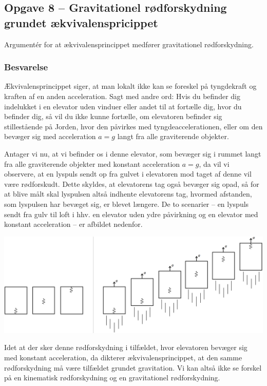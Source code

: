 \documentclass[../main.tex]{subfiles}
\begin{document}

\subsection{Opgave 8 -- Gravitationel rødforskydning grundet ækvivalenspricippet}
\setcounter{subsection}{8}
\setcounter{equation}{0}

Argumentér for at ækvivalensprincippet medfører gravitationel rødforskydning.


\subsubsection{Besvarelse}

Ækvivalensprincippet siger, at man lokalt ikke kan se foreskel på tyngdekraft og kraften af en anden acceleration. Sagt med andre ord: Hvis du befinder dig indelukket i en elevator uden vinduer eller andet til at fortælle dig, hvor du befinder dig, så vil du ikke kunne fortælle, om elevatoren befinder sig stillestående på Jorden, hvor den påvirkes med tyngdeaccelerationen, eller om den bevæger sig med acceleration $a = g$ langt fra alle graviterende objekter.

Antager vi nu, at vi befinder os i denne elevator, som bevæger sig i rummet langt fra alle graviterende objekter med konstant acceleration $a = g$, da vil vi observere, at en lyspuls sendt op fra gulvet i elevatoren mod taget af denne vil være rødforskudt. Dette skyldes, at elevatorens tag også bevæger sig opad, så for at blive målt skal lyspulsen altså indhente elevatorens tag, hvormed afstanden, som lyspulsen har bevæget sig, er blevet længere. De to scenarier -- en lyspuls sendt fra gulv til loft i hhv. en elevator uden ydre påvirkning og en elevator med konstant acceleration -- er afbildet nedenfor.
\begin{center}
    \includegraphics[width=\textwidth]{billeder/GravitationalRedshift.png}
\end{center}
Idet at der sker denne rødforskydning i tilfældet, hvor elevatoren bevæger sig med konstant acceleration, da dikterer ækvivalensprincippet, at den samme rødforskydning må være tilfældet grundet gravitation. Vi kan altså ikke se forskel på en kinematisk rødforskydning og en gravitationel rødforskydning.
\end{document}
